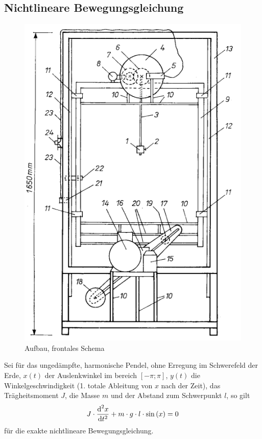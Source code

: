 \documentclass[numbers=noenddot,12pt,a4paper]{scrartcl}
\newcommand{\diff}{\textnormal{d}}
\begin{document}
\subsection{Nichtlineare Bewegungsgleichung}
\begin{figure}
\includegraphics[scale=0.3]{pendel.png}
\caption{Aufbau, frontales Schema}
\label{img:aufbau}
\end{figure}
Sei für das ungedämpfte, harmonische Pendel, ohne Erregung im Schwerefeld der Erde, $x(t)$ der Auslenkwinkel im bereich $\left[-\pi; \pi\right]$, $y(t)$ die Winkelgeschwindigkeit (1. totale Ableitung von $x$ nach der Zeit), das Trägheitsmoment $J$, die Masse $m$ und der Abstand zum Schwerpunkt $l$, so gilt
\begin{align}
J\cdot \frac{\diff^2 x}{\diff t^2}+m\cdot g\cdot l\cdot  \sin\left(x\right)=0
\end{align}
für die exakte nichtlineare Bewegungsgleichung.\\
\end{document}
